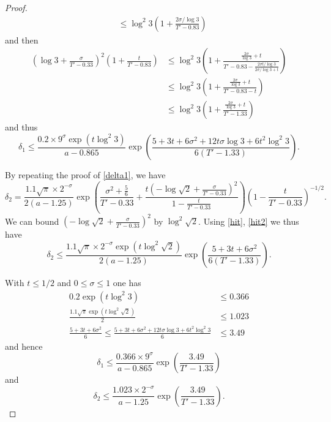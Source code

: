 \begin{proof}
\begin{align*}
&\leq  \log^2 3 (1 + \frac{2 \sigma / \log 3}{T' - 0.83})
\end{align*}
and then
\begin{align*}
(\log 3 + \frac{\sigma}{T'-0.33})^2 (1 + \frac{t}{T'-0.83}) 
&\leq \log^2 3 (1 + \frac{\frac{2 \sigma}{\log 3} + t}{T' - 0.83 - \frac{2\sigma t/\log 3}{2\sigma/\log 3 + t}}) \\
&\leq \log^2 3 (1 + \frac{\frac{2 \sigma}{\log 3} + t}{T' - 0.83 - t}) \\
&\leq \log^2 3 (1 + \frac{\frac{2 \sigma}{\log 3} + t}{T' - 1.33}) 
\end{align*}
and thus
$$ \delta_1 \leq \frac{0.2 \times 9^\sigma \exp( t \log^2 3 )}{a-0.865} \exp( \frac{5+3t+6\sigma^2 + 12 t \sigma \log 3 + 6t^2 \log^2 3}{6(T'-1.33)} ).$$

By repeating the proof of \eqref{delta1}, we have
$$
 \delta_2 = \frac{1.1 \sqrt{\pi} \times 2^{-\sigma}}{2(a - 1.25)} \exp( \frac{\sigma^2 + \frac{5}{6}}{T'-0.33} + \frac{t(-\log \sqrt{2} + \frac{\sigma}{T'-0.33})^2}{1 - \frac{t}{T'-0.33}} ) (1 - \frac{t}{T'-0.33})^{-1/2}.$$
We can bound $(-\log \sqrt{2} + \frac{\sigma}{T'-0.33})^2$ by $\log^2 \sqrt{2}$.  Using \eqref{hit}, \eqref{hit2} we thus have
$$
 \delta_2 \leq \frac{1.1 \sqrt{\pi} \times 2^{-\sigma} \exp( t \log^2 \sqrt{2})}{2(a - 1.25)} \exp( \frac{5 + 3t + 6\sigma^2}{6(T'-1.33)} ).
$$

With $t \leq 1/2$ and $0 \leq \sigma \leq 1$ one has
\begin{align*}
 0.2 \exp(t \log^2 3) &\leq 0.366 \\
\frac{1.1 \sqrt{\pi} \exp( t \log^2 \sqrt{2})}{2} &\leq 1.023 \\
\frac{5 + 3t + 6\sigma^2}{6} \leq \frac{5 + 3t + 6\sigma^2 + 12 t \sigma \log 3 + 6t^2 \log^2 3}{6} &\leq 3.49
\end{align*}
and hence
$$ \delta_1 \leq \frac{0.366 \times 9^\sigma}{a-0.865} \exp( \frac{3.49}{T'-1.33} )$$
and
$$ \delta_2 \leq \frac{1.023 \times 2^{-\sigma}}{a-1.25} \exp( \frac{3.49}{T'-1.33} ).$$



\end{proof}
